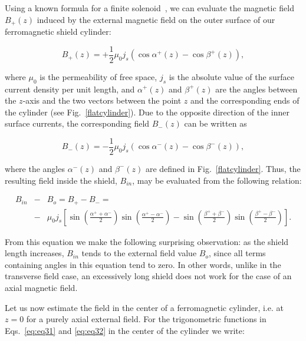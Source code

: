 \documentclass[12pt]{article}
\begin{document}
Using a known formula for a finite solenoid~\cite{jackson}, we can evaluate the 
magnetic field $B_+(z)$ induced by the external magnetic field on the outer surface 
of our ferromagnetic shield cylinder: 

\begin{equation}
B_+(z)=+\frac{1}{2}\mu_0 j_s \left( \cos \alpha^+(z) - \cos \beta^+(z) \right),
\label{eq:eq31}
\end{equation}

\noindent
where $\mu_0$ is the permeability of free space, $j_s$ is the absolute value of the 
surface current density per unit length, and $\alpha^+(z)$ and $\beta^+(z)$ are 
the angles between the $z$-axis and the two vectors between the point $z$ and the 
corresponding ends of the cylinder (see Fig.~\ref{flatcylinder}). Due to the opposite 
direction of the inner surface currents, the corresponding field $B_-(z)$ can be
written as

\begin{equation}
B_-(z)=-\frac{1}{2}\mu_0 j_s \left(\cos \alpha^-(z) - \cos \beta^-(z) \right),
\label{eq:eq32}
\end{equation}

\noindent
where the angles $\alpha^-(z)$ and $\beta^-(z)$ are defined in Fig.~\ref{flatcylinder}.
Thus, the resulting field inside the shield, $B_{in}$, may be evaluated from 
the following relation:

\begin{eqnarray}
B_{in}\!\!\!\!&-&\!\!\!\!B_o = B_+ - B_- = \\ \nonumber
&-&\!\!\!\!\!\mu_0 j_s
\left[ \sin \left(\frac{\alpha^+ + \alpha^-}{2} \right) \sin\left(\frac{\alpha^+ - 
\alpha^-}{2}\right) - \sin \left( \frac{\beta^+ + \beta^-}{2}\right)
\sin \left(\frac{\beta^+ - \beta^-}{2}\right) \right].
\label{eq:eq1}
\end{eqnarray}

\noindent
From this equation we make the following surprising observation: as the shield
length increases, $B_{in}$ tends to the external field value $B_o$, since all   
terms containing angles in this equation tend to zero. In other words, unlike in 
the transverse field case, an excessively long shield does not work for the case
of an axial magnetic field. 

Let us now estimate the field in the center of a ferromagnetic cylinder, i.e. at 
$z=0$ for a purely axial external field. For the trigonometric functions in 
Eqs.~\ref{eq:eq31} and \ref{eq:eq32} in the center of the cylinder we write:
\end{document}
